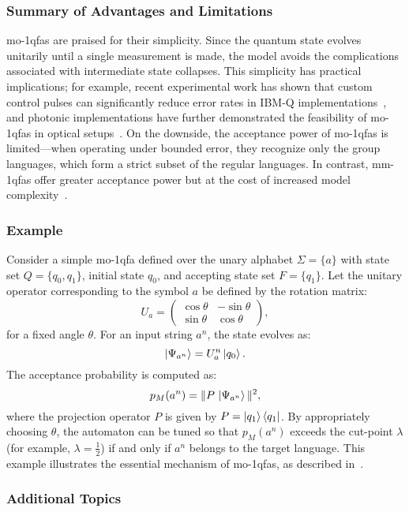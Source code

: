 \subsubsection{Summary of Advantages and Limitations}
\glspl{mo-1qfa} are praised for their simplicity. Since the quantum state evolves unitarily until a single measurement is made, the model avoids the complications associated with intermediate state collapses. This simplicity has practical implications; for example, recent experimental work has shown that custom control pulses can significantly reduce error rates in IBM-Q implementations~\cite{lussi2024implementing}, and photonic implementations have further demonstrated the feasibility of \glspl{mo-1qfa} in optical setups~\cite{candeloro2021enhanced}. On the downside, the acceptance power of \glspl{mo-1qfa} is limited—when operating under bounded error, they recognize only the group languages, which form a strict subset of the regular languages. In contrast, \glspl{mm-1qfa} offer greater acceptance power but at the cost of increased model complexity~\cite{kondacs1997power,berzicna2001ambainis}.

\subsubsection{Example}
Consider a simple \gls{mo-1qfa} defined over the unary alphabet $\Sigma=\{a\}$ with state set $Q=\{q_0,q_1\}$, initial state $q_0$, and accepting state set $F=\{q_1\}$. Let the unitary operator corresponding to the symbol $a$ be defined by the rotation matrix:
\[
U_a = \begin{pmatrix}
\cos\theta & -\sin\theta \\
\sin\theta & \cos\theta
\end{pmatrix},
\]
for a fixed angle $\theta$. For an input string $a^n$, the state evolves as:
\[
\ket{\Psi_{a^n}} = U_a^n \ket{q_0}.
\]
The acceptance probability is computed as:
\[
p_M(a^n)=\|P\,\ket{\Psi_{a^n}}\|^2,
\]
where the projection operator $P$ is given by $P=\ket{q_1}\bra{q_1}$. By appropriately choosing $\theta$, the automaton can be tuned so that $p_M(a^n)$ exceeds the cut-point $\lambda$ (for example, $\lambda=\frac{1}{2}$) if and only if $a^n$ belongs to the target language. This example illustrates the essential mechanism of \glspl{mo-1qfa}, as described in~\cite{moore2000quantum,brodsky2002characterizations}.

\subsubsection{Additional Topics}
